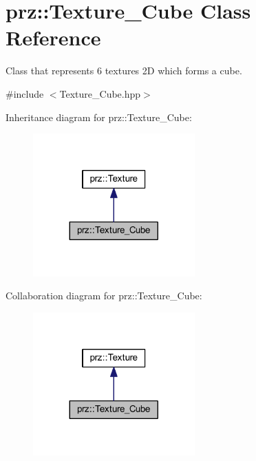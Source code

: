 \hypertarget{classprz_1_1_texture___cube}{}\section{prz\+::Texture\+\_\+\+Cube Class Reference}
\label{classprz_1_1_texture___cube}


Class that represents 6 textures 2D which forms a cube.  




{\ttfamily \#include $<$Texture\+\_\+\+Cube.\+hpp$>$}



Inheritance diagram for prz\+::Texture\+\_\+\+Cube\+:
\nopagebreak
\begin{figure}[H]
\begin{center}
\leavevmode
\includegraphics[width=176pt]{classprz_1_1_texture___cube__inherit__graph}
\end{center}
\end{figure}


Collaboration diagram for prz\+::Texture\+\_\+\+Cube\+:
\nopagebreak
\begin{figure}[H]
\begin{center}
\leavevmode
\includegraphics[width=176pt]{classprz_1_1_texture___cube__coll__graph}
\end{center}
\end{figure}
